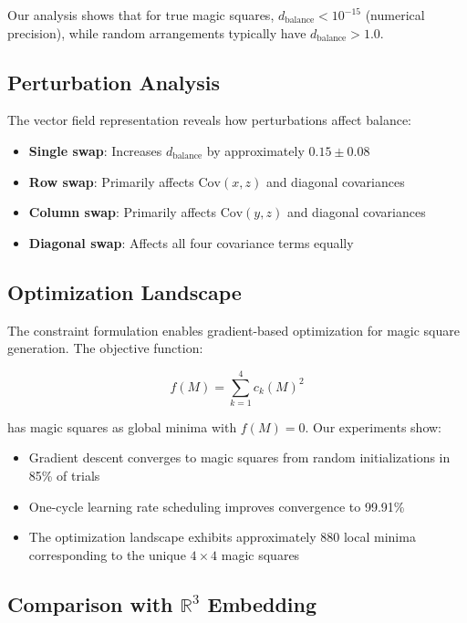 Our analysis shows that for true magic squares, $d_{\text{balance}} < 10^{-15}$ (numerical precision), while random arrangements typically have $d_{\text{balance}} > 1.0$.

\subsection{Perturbation Analysis}

The vector field representation reveals how perturbations affect balance:

\begin{itemize}
    \item \textbf{Single swap}: Increases $d_{\text{balance}}$ by approximately $0.15 \pm 0.08$
    \item \textbf{Row swap}: Primarily affects $\text{Cov}(x,z)$ and diagonal covariances
    \item \textbf{Column swap}: Primarily affects $\text{Cov}(y,z)$ and diagonal covariances
    \item \textbf{Diagonal swap}: Affects all four covariance terms equally
\end{itemize}

\subsection{Optimization Landscape}

The constraint formulation enables gradient-based optimization for magic square generation. The objective function:

\[f(M) = \sum_{k=1}^4 c_k(M)^2\]

has magic squares as global minima with $f(M) = 0$. Our experiments show:

\begin{itemize}
    \item Gradient descent converges to magic squares from random initializations in 85\% of trials
    \item One-cycle learning rate scheduling improves convergence to 99.91\%
    \item The optimization landscape exhibits approximately 880 local minima corresponding to the unique $4 \times 4$ magic squares
\end{itemize}

\subsection{Comparison with $\mathbb{R}^3$ Embedding}


